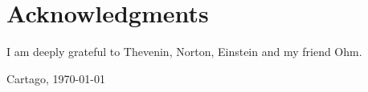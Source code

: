 \chapter*{Acknowledgments}
\thispagestyle{empty}

I am deeply grateful to Thevenin, Norton, Einstein and my friend Ohm.

\vspace*{1cm}

\scriptAuthor

Cartago, \today\par

\cleardoublepage

